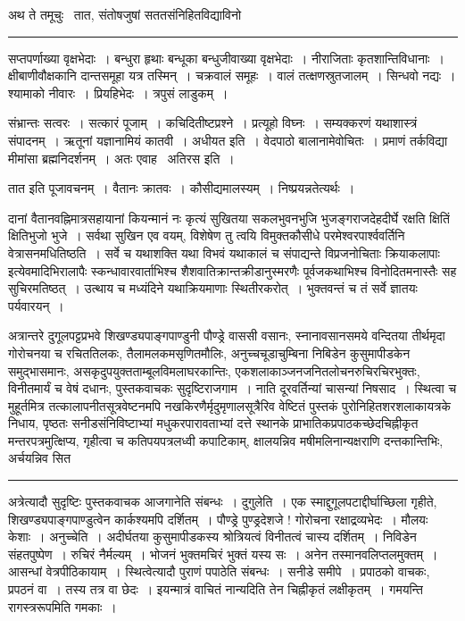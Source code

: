 \documentclass[11pt, openany]{book}
\begin{document}
अथ ते तमूचुः \textendash\ तात, संतोषजुषां सततसंनिहितविद्याविनो

\vspace{2mm}
\hrule

\noindent
{\s सप्तपर्णाख्या वृक्षभेदाः~। बन्धुरा हृथाः बन्धूका बन्धुजीवाख्या वृक्षभेदाः~। नीराजिताः कृतशान्तिविधानाः~। क्षीबाणीवौक्षकानि दान्तसमूहा यत्र तस्मिन्~। चक्रवालं समूहः~। वालं तत्क्षणस्रुतजालम्~। सिन्धवो नद्यः~। श्यामाको नीवारः~। प्रियहिभेदः~। त्रपुसं लाडुकम्~।

संभ्रान्तः सत्वरः~। सत्कारं पूजाम्~। कचिदितीष्टप्रश्ने~। प्रत्यूहो विघ्नः~। सम्यक्करणं यथाशास्त्रं संपादनम्~। ऋतूनां यज्ञानामियं कातवी~। {\qtt अधीयत इति}~। वेदपाठो बालानामेवोचितः~। प्रमाणं तर्कविद्या मीमांसा ब्रह्मनिदर्शनम्~। अतः एवाह \textendash\ {\qtt अतिरस इति}~।

तात इति पूजावचनम्~। वैतानः क्रातवः~। कौसीद्यमालस्यम्~। निष्प्रयन्नतेत्यर्थः~।}

\newpage

\noindent
दानां वैतानवह्निमात्रसहायानां कियन्मानं नः कृत्यं सुखितया सकलभुवनभुजि भुजङ्गराजदेहदीर्घे रक्षति क्षितिं क्षितिभुजो भुजे~। सर्वथा सुखिन एव वयम्, विशेषेण तु त्वयि विमुक्तकौसीधे परमेश्वरपार्श्ववर्तिनि वेत्रासनमधितिष्ठति~। सर्वे च यथाशक्ति यथा विभवं यथाकालं च संपाद्यन्ते विप्रजनोचिताः क्रियाकलापाः इत्येवमादिभिरालापैः स्कन्धावारवार्ताभिश्च शैशवातिक्रान्तक्रीडानुस्मरणैः पूर्वजकथाभिश्च विनोदितमनास्तैः सह सुचिरमतिष्ठत्~। उत्थाय च मध्यंदिने यथाक्रियमाणाः स्थितीरकरोत्~। भुक्तवन्तं च तं सर्वे ज्ञातयः पर्यवारयन्~।

अत्रान्तरे दुगूलपट्टप्रभवे शिखण्ड्यपाङ्गपाण्डुनी पौण्ड्रे वाससी वसानः, स्नानावसानसमये वन्दितया तीर्थमृदा गोरोचनया च रचिततिलकः, तैलामलकमसृणितमौलिः, अनुच्चचूडाचुम्बिना निबिडेन कुसुमापीडकेन समुद्भासमानः, असकृदुपयुक्तताम्बूलविमलाघरकान्तिः, एकशलाकाञ्जनजनितलोचनरुचिरचिरभुक्तः, विनीतमार्यं च वेषं दधानः, पुस्तकवाचकः सुदृष्टिराजगाम~। नाति दूरवर्तिन्यां चासन्यां निषसाद~। स्थित्वा च मुहूर्तमित्र तत्कालापनीतसूत्रवेष्टनमपि नखकिरणैर्मृदुमृणालसूत्रैरिव वेष्टितं पुस्तकं पुरोनिहितशरशलाकायत्रके निधाय, पृष्ठतः सनीडसंनिविष्टाभ्यां मधुकरपारावताभ्यां दत्ते स्थानके प्राभातिकप्रपाठकच्छेदचिह्नीकृत मन्तरपत्रमुत्क्षिप्य, गृहीत्वा च कतिपयपत्रलध्वी कपाटिकाम्, क्षालयन्निव मषीमलिनान्यक्षराणि दन्तकान्तिभिः, अर्चयन्निव सित\textendash

\vspace{2mm}
\hrule

{\s अत्रेत्यादौ सुदृष्टिः पुस्तकवाचक आजगानेति संबन्धः~। {\qtt दुगुलेति}~। एक स्माद्दुगूलपटाद्दीर्घाच्छिला गृहीते, शिखण्ड्यपाङ्गपाण्डुत्वेन कार्कश्यमपि दर्शितम्~। पौण्ड्रे पुण्ड्रदेशजे ! गोरोचना रक्षाद्रव्यभेदः~। मौलयः केशाः~। अनुच्चेति~। अदीर्घतया कुसुमापीडकस्य श्रोत्रियत्वं विनीतत्वं चास्य दर्शितम्~। निविडेन संहतपुष्पेण~। रुचिरं नैर्मल्यम्~। भोजनं भुक्तमचिरं भुक्तं यस्य सः~। अनेन तस्मानवलिप्तलमुक्तम्~। आसन्धां वेत्रपीठिकायाम्~। स्थित्वेत्यादौ पुराणं पपाठेति संबन्धः~। सनीडे समीपे~। प्रपाठको वाचकः, प्रपठनं वा~। तस्य तत्र वा छेदः~। इयन्मात्रं वाचितं नान्यदिति तेन चिह्नीकृतं लक्षीकृतम्~। गमयन्ति रागस्त्ररूपमिति गमकाः~।}
\end{document}
